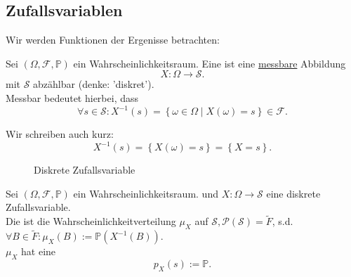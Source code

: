 \subsection{Zufallsvariablen}
Wir werden Funktionen der Ergenisse betrachten:
\begin{definition}
    Sei $(\Omega, \mathcal{F}, \mathbb{P})$ ein Wahrscheinlichkeitsraum. Eine  ist eine \underline{messbare} Abbildung
    \[
    X : \Omega \longrightarrow \mathcal{S}
    .\] 
    mit $\mathcal{S}$ abzählbar (denke: 'diskret'). \\
    Messbar bedeutet hierbei, dass
    \[
        \forall s\in \mathcal{S} \colon X^{-1}(s) = \left \{\omega\in \Omega\mid  X(\omega) = s\right\} \in  \mathcal{F}
    .\] 
\end{definition}
\begin{notation}
    Wir schreiben auch kurz:
    \[
        X^{-1}(s) = \left \{X(\omega) = s\right\}  = \left \{X = s\right\} 
    .\] 
\end{notation}

\begin{figure}[ht]
    \centering
    \caption{Diskrete Zufallsvariable}
    \label{fig:diskrete-zufallsvariable}
\end{figure}
\begin{definition}
    Sei $(\Omega, \mathcal{F}, \mathbb{P})$ ein Wahrscheinlichkeitsraum.  und $X : \Omega\to \mathcal{S}$ eine diskrete Zufallsvariable. \\
    Die  ist die Wahrscheinlichkeitverteilung $\mu_X$ auf  $\mathcal{S}, \mathcal{P}(\mathcal{S}) = \tilde{F}$, s.d. $\forall B\in \tilde{F}: \mu_X(B) := \mathbb{P}(X^{-1}(B))$. \\
    $\mu_X$ hat eine 
     \[
         p_{X}(s) := \mathbb{P}
    .\] 
\end{definition}

